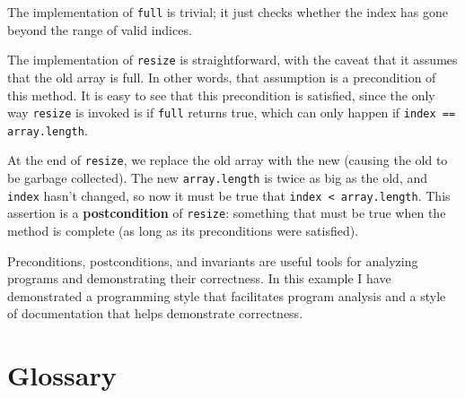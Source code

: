 
The implementation of {\tt full} is trivial; it just checks
whether the index has gone beyond the range of valid indices.

The implementation of {\tt resize} is straightforward, with
the caveat that it assumes that the old array is full.  In other
words, that assumption is a precondition of this method.  It is
easy to see that this precondition is satisfied, since the only
way {\tt resize} is invoked is if {\tt full} returns true,
which can only happen if {\tt index == array.length}.

At the end of {\tt resize}, we replace the old array with
the new (causing the old to be garbage collected).  The
new {\tt array.length} is twice as big as the old, and 
{\tt index} hasn't changed, so now it must be true that
{\tt index < array.length}.  This assertion is a {\bf postcondition}
of {\tt resize}: something that must be true when the method
is complete (as long as its preconditions were satisfied).

Preconditions, postconditions, and invariants are useful tools
for analyzing programs and demonstrating their correctness.
In this example I have demonstrated a programming style that
facilitates program analysis and a style of documentation that
helps demonstrate correctness.


\section{Glossary}

